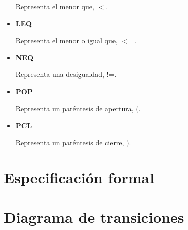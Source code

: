 \documentclass[\main/MemoriaPL.tex]{subfiles}
\begin{document}
\begin{itemize}
            Representa el menor que, $<$.
      \item \textbf{LEQ}
            \par \noindent
            Representa el menor o igual que, $<$=.
      \item \textbf{NEQ}
            \par \noindent
            Representa una desigualdad, !=.
      \item \textbf{POP}
            \par \noindent
            Representa un paréntesis de apertura, $($.
      \item \textbf{PCL}
            \par \noindent
            Representa un paréntesis de cierre, $)$.
    \end{itemize}

\section{Especificación formal} %


\section{Diagrama de transiciones} %
\end{document}
